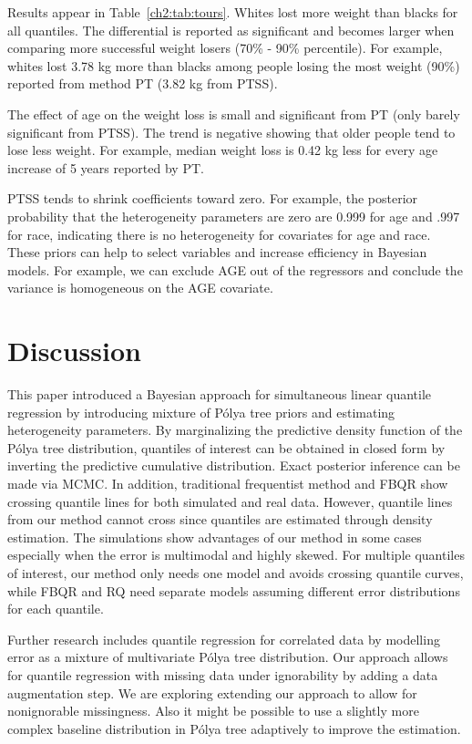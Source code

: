 \documentclass[12pt]{article}
\newcommand{\polya}{P\'{o}lya}
\begin{document}
Results appear in Table~\ref{ch2:tab:tours}.
Whites lost more weight than blacks for all quantiles.
The differential is reported as significant and becomes larger when comparing more successful weight losers (70\% - 90\% percentile).
For example, whites lost 3.78 kg more than blacks among people losing the most weight (90\%) reported from method PT (3.82 kg from PTSS).

The effect of age on the weight loss is small and significant from PT (only barely significant from PTSS).
The trend is negative showing that older people tend to lose less weight.
For example, median weight loss is 0.42 kg less for every age increase of 5 years reported by PT.

PTSS tends to shrink coefficients toward zero. For example, the
posterior probability that the heterogeneity parameters are zero are
0.999 for age and .997 for race, indicating there is no
heterogeneity for covariates for age and race. These priors can help to select
variables and increase efficiency in Bayesian models. For example, we
can exclude AGE out of the regressors and conclude the variance is
homogeneous on the AGE covariate.


\section{Discussion}
\label{ch2:sec:discussion}
This paper introduced a Bayesian approach for simultaneous linear quantile regression by introducing mixture of \polya{} tree priors and estimating heterogeneity parameters.
By marginalizing the predictive density function of the \polya{} tree distribution, quantiles of interest can be obtained in closed form by inverting the predictive cumulative distribution.
Exact posterior inference can be made via MCMC.
In addition, traditional frequentist method and FBQR show crossing quantile lines for both simulated and real data.
However, quantile lines from our method cannot cross since quantiles are estimated through density estimation.
The simulations show advantages of our method in some cases especially when the error is multimodal and highly skewed.
For multiple quantiles of interest, our method only needs one model and avoids crossing quantile curves, while FBQR and RQ need separate models assuming different error distributions for each quantile.

Further research includes quantile regression for correlated data by modelling error as a mixture of multivariate \polya{} tree distribution.
Our approach allows for quantile regression with missing data under ignorability by adding a data augmentation step.
We are exploring extending our approach to allow for nonignorable missingness.
Also it might be possible to use a slightly more complex baseline distribution in \polya{} tree adaptively to improve the estimation.

 
\end{document}
